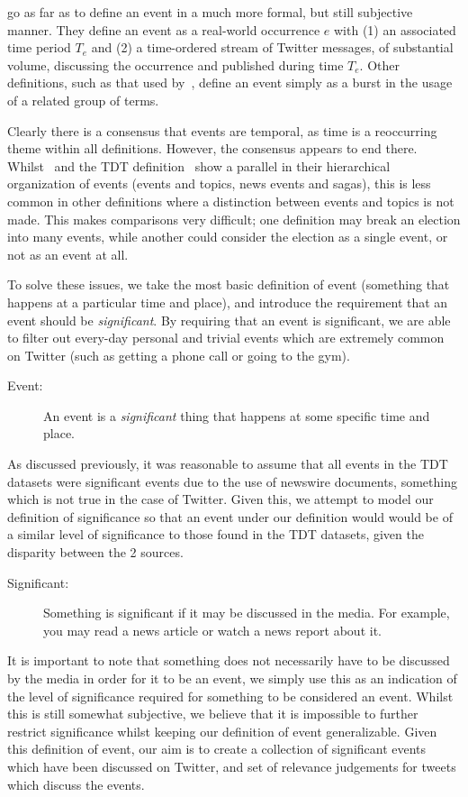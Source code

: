 \cite{Becker_beyondtrending} go as far as to define an event in a much more formal, but still subjective manner.
They define an event as a real-world occurrence \(e\) with (1) an associated time period \(T_e\) and (2) a time-ordered stream of Twitter messages, of substantial volume, discussing the occurrence and published during time \(T_e\).
Other definitions, such as that used by~\cite{weng2011event}, define an event simply as a burst in the usage of a related group of terms.

Clearly there is a consensus that events are temporal, as time is a reoccurring theme within all definitions.
However, the consensus appears to end there.
Whilst~\cite{aggarwalevent} and the TDT definition~\citep{Allan:2002:ITD:772260.772262} show a parallel in their hierarchical organization of events (events and topics, news events and sagas), this is less common in other definitions where a distinction between events and topics is not made.
This makes comparisons very difficult; one definition may break an election into many events, while another could consider the election as a single event, or not as an event at all.

To solve these issues, we take the most basic definition of event (something that happens at a particular time and place), and introduce the requirement that an event should be \textit{significant}.
By requiring that an event is significant, we are able to filter out every-day personal and trivial events which are extremely common on Twitter (such as getting a phone call or going to the gym).

\begin{description}
\item[Event:] An event is a \emph{significant} thing that happens at some specific time and place.
\end{description}

As discussed previously, it was reasonable to assume that all events in the TDT datasets were significant events due to the use of newswire documents, something which is not true in the case of Twitter.
Given this, we attempt to model our definition of significance so that an event under our definition would would be of a similar level of significance to those found in the TDT datasets, given the disparity between the 2 sources.

\begin{description}
\item[Significant:] Something is significant if it may be discussed in the media. For example, you may read a news article or watch a news report about it.
\end{description}

It is important to note that something does not necessarily have to be discussed by the media in order for it to be an event, we simply use this as an indication of the level of significance required for something to be considered an event.
Whilst this is still somewhat subjective, we believe that it is impossible to further restrict significance whilst keeping our definition of event generalizable.
Given this definition of event, our aim is to create a collection of significant events which have been discussed on Twitter, and set of relevance judgements for tweets which discuss the events.
